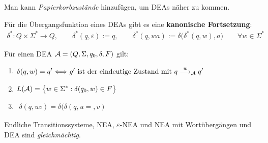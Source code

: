 Man kann \textit{Papierkorbzustände} hinzufügen, um DEAs näher zu kommen.

\begin{definition}\label{def2.3}
	Für die Übergangsfunktion eines DEAs gibt es eine \textbf{kanonische Fortsetzung}:
	\begin{align*}
		\delta^\ast:Q\times\Sigma^\ast\to Q,\qquad
		\delta^\ast(q,\varepsilon):=q,\qquad
		\delta^\ast(q,wa):=\delta\big(\delta^\ast(q,w),a\big)\qquad\forall w\in\Sigma^\ast
	\end{align*}
\end{definition}

\begin{bemerkungnr}\label{bemerkungDEA}
	Für einen DEA $\mathcal{A}=(Q,\Sigma,q_0,\delta,F)$ gilt:
	\begin{enumerate}
		\item $\begin{aligned}
			\delta(q,w)=q'\Longleftrightarrow g'\text{ ist der eindeutige Zustand mit }q\overset{w}{\longrightarrow}_{\mathcal{A}} q'
		\end{aligned}$
		\item $\begin{aligned}
			L(\mathcal{A})=\big\lbrace w\in\Sigma^\ast:\delta(q_0,w)\in F\big\rbrace
		\end{aligned}$
		\item $\begin{aligned}
			\delta(q,uv)=\delta\big(\delta(q,u=,v)
		\end{aligned}$
	\end{enumerate}
\end{bemerkungnr}

\begin{satz}\label{satz1.9}
	Endliche Transitionssysteme, NEA, $\varepsilon$-NEA und NEA mit Wortübergängen und DEA sind \textit{gleichmächtig}. 
\end{satz}

